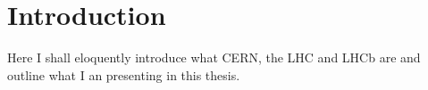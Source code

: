 \chapter{Introduction}

Here I shall eloquently introduce what CERN, the LHC and LHCb are and outline what I an presenting in this thesis.
